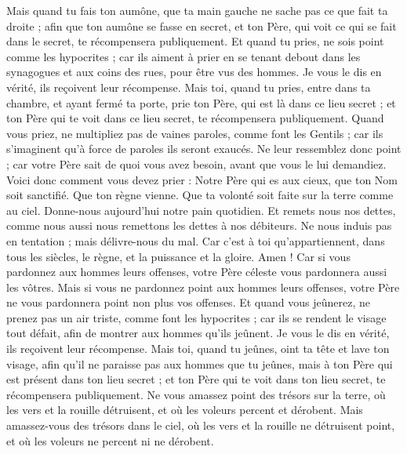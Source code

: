 \begin{multicols}{2}
Mais quand tu fais ton aumône, que ta main gauche ne sache pas ce que fait ta droite ;
afin que ton aumône se fasse en secret, et ton Père, qui voit ce qui se fait dans le secret, te récompensera publiquement.
Et quand tu pries, ne sois point comme les hypocrites ; car ils aiment à prier en se tenant debout dans les synagogues et aux coins des rues, pour être vus des hommes. Je vous le dis en vérité, ils reçoivent leur récompense.
Mais toi, quand tu pries, entre dans ta chambre, et ayant fermé ta porte, prie ton Père, qui est là dans ce lieu secret ; et ton Père qui te voit dans ce lieu secret, te récompensera publiquement.
Quand vous priez, ne multipliez pas de vaines paroles, comme font les Gentils ; car ils s'imaginent qu'à force de paroles ils seront exaucés.
Ne leur ressemblez donc point ; car votre Père sait de quoi vous avez besoin, avant que vous le lui demandiez.
Voici donc comment vous devez prier : Notre Père qui es aux cieux, que ton Nom soit sanctifié.
Que ton règne vienne. Que ta volonté soit faite sur la terre comme au ciel.
Donne-nous aujourd'hui notre pain quotidien.
Et remets nous nos dettes, comme nous aussi nous remettons les dettes à nos débiteurs.
Ne nous induis pas en tentation ; mais délivre-nous du mal. Car c'est à toi qu'appartiennent, dans tous les siècles, le règne, et la puissance et la gloire. Amen !
Car si vous pardonnez aux hommes leurs offenses, votre Père céleste vous pardonnera aussi les vôtres.
Mais si vous ne pardonnez point aux hommes leurs offenses, votre Père ne vous pardonnera point non plus vos offenses.
Et quand vous jeûnerez, ne prenez pas un air triste, comme font les hypocrites ; car ils se rendent le visage tout défait, afin de montrer aux hommes qu'ils jeûnent. Je vous le dis en vérité, ils reçoivent leur récompense.
Mais toi, quand tu jeûnes, oint ta tête et lave ton visage,
afin qu'il ne paraisse pas aux hommes que tu jeûnes, mais à ton Père qui est présent dans ton lieu secret ; et ton Père qui te voit dans ton lieu secret, te récompensera publiquement.
Ne vous amassez point des trésors sur la terre, où les vers et la rouille détruisent, et où les voleurs percent et dérobent.
Mais amassez-vous des trésors dans le ciel, où les vers et la rouille ne détruisent point, et où les voleurs ne percent ni ne dérobent.

\end{multicols}
